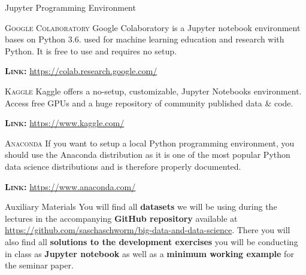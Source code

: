 \documentclass[main.tex]{subfiles}
\begin{document}
    \begin{frame}{Jupyter Programming Environment}
        \begin{alertblock}{\textsc{Google Colaboratory}}
            Google Colaboratory is a Jupyter notebook environment bases on Python 3.6. used for machine learning education and research with Python. It is free to use and requires no setup. 
            \vspace{-1mm}
            
            \textsc{\textbf{Link:}} \href{https://colab.research.google.com/}{https://colab.research.google.com/}
        \end{alertblock}
        \begin{alertblock}{\textsc{Kaggle}}  
            Kaggle offers a no-setup, customizable, Jupyter Notebooks environment. Access free GPUs and a huge repository of community published data \& code.
            \vspace{-1mm}

            \textsc{\textbf{Link:}} \href{https://www.kaggle.com/}{https://www.kaggle.com/}
        \end{alertblock}
        \begin{alertblock}{\textsc{Anaconda}}
            If you want to setup a local Python programming environment, you should use the Anaconda distribution as it is one of the most popular Python data science distributions and is therefore properly documented.
            \vspace{-1mm}
            
            \textsc{\textbf{Link:}} \href{https://www.anaconda.com/}{https://www.anaconda.com/}
        \end{alertblock}
    \end{frame}

    \begin{frame}{Auxiliary Materials}
        You will find all \textbf{datasets} we will be using during the lectures in the accompanying \textbf{GitHub repository} available at \href{https://github.com/saschaschworm/big-data-and-data-science}{https://github.com/saschaschworm/big-data-and-data-science}. There you will also find all \textbf{solutions to the development exercises} you will be conducting in class as \textbf{Jupyter notebook} as well as a \textbf{minimum working example} for the seminar paper.
    \end{frame}
\end{document}
